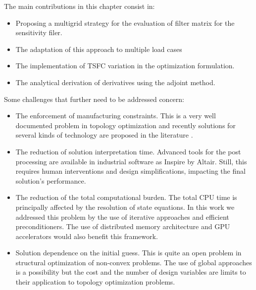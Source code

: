The main contributions in this chapter consist in:
\begin{itemize}
\item Proposing a multigrid strategy for the evaluation of filter matrix for the sensitivity filer. 
\item The adaptation of this approach to multiple load cases
\item The implementation of TSFC variation in the optimization formulation.
\item The analytical derivation of derivatives using the adjoint method.
\end{itemize}
Some challenges that further need to be addressed concern:
\begin{itemize}
\item The enforcement of manufacturing constraints. This is a very well documented problem in topology optimization and recently solutions for several kinds of technology are proposed in the literature \cite{liu_current_2018}.
\item The reduction of solution interpretation time. Advanced tools for the post processing are available in industrial software as Inspire by Altair. Still, this requires human interventions and design simplifications, impacting the final solution's performance.  
\item The reduction of the total computational burden. The total CPU time is principally affected by the resolution of state equations. In this work we addressed this problem by the use of iterative approaches and efficient preconditioners. The use of distributed memory architecture \cite{aage2017giga} and GPU accelerators \cite{wadbro2009megapixel} would also benefit this framework.
\item Solution dependence on the initial guess. This is quite an open problem in structural optimization of non-convex problems. The use of global approaches \cite{simon2013evolutionary} is a possibility but the cost and the number of design variables are limits to their application to topology optimization problems.
\end{itemize}
